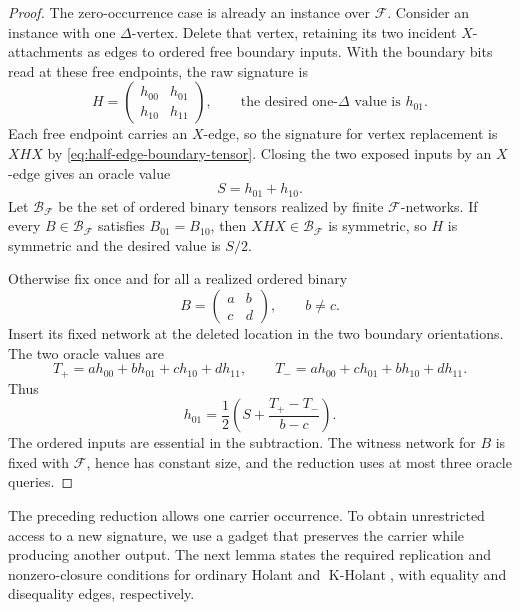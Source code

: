\documentclass[11pt,letterpaper,onecolumn]{article}
\theoremstyle{plain}
\theoremstyle{definition}
\theoremstyle{remark}
\newcommand{\cF}{\mathcal F}
\newcommand{\KHolant}{\operatorname{K\text{-}Holant}}
\begin{document}
\begin{proof}
The zero-occurrence case is already an instance over \(\cF\).  Consider an
instance with one \(\Delta\)-vertex.  Delete that vertex, retaining its two
incident \(X\)-attachments as edges to ordered free boundary inputs.
With the boundary bits read at these free endpoints, the raw signature is
\[
  H=\begin{pmatrix}h_{00}&h_{01}\\h_{10}&h_{11}\end{pmatrix},
  \qquad\text{the desired one-\(\Delta\) value is }h_{01}.
\]
Each free endpoint carries an \(X\)-edge, so the signature for vertex
replacement is \(XHX\) by \cref{eq:half-edge-boundary-tensor}.
Closing the two exposed inputs by an \(X\)-edge gives an oracle value
\[
  S=h_{01}+h_{10}.
\]
Let \(\mathcal B_\cF\) be the set of ordered binary tensors realized by
finite \(\cF\)-networks.  If every \(B\in\mathcal B_\cF\) satisfies
  \(B_{01}=B_{10}\), then \(XHX\in\mathcal B_\cF\) is symmetric, so
  \(H\) is symmetric and the desired value is
  \(S/2\).

Otherwise fix once and for all a realized ordered binary
\[
  B=\begin{pmatrix}a&b\\c&d\end{pmatrix},
  \qquad b\ne c.
\]
Insert its fixed network at the deleted location in the two boundary
orientations.  The two oracle values are
\[
  T_+=ah_{00}+bh_{01}+ch_{10}+dh_{11},
  \qquad
  T_-=ah_{00}+ch_{01}+bh_{10}+dh_{11}.
\]
Thus
\[
  h_{01}
  =\frac12\left(S+\frac{T_+-T_-}{b-c}\right).
\]
The ordered inputs are essential in the subtraction.  The witness network for
\(B\) is fixed with \(\cF\), hence has constant size, and the reduction
uses at most three oracle queries.
\end{proof}

The preceding reduction allows one carrier occurrence. To obtain
unrestricted access to a new signature, we use a gadget that preserves
the carrier while producing another output. The next lemma states the
required replication and nonzero-closure conditions for ordinary Holant
and \(\KHolant\), with equality and disequality edges, respectively.
\end{document}
